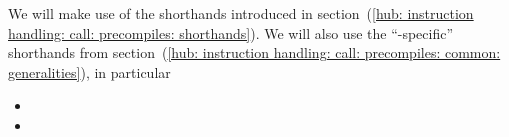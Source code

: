 We will make use of the shorthands introduced in
section~(\ref{hub: instruction handling: call: precompiles: shorthands}).
We will also use the ``-specific'' shorthands from
section~(\ref{hub: instruction handling: call: precompiles: common: generalities}),
in particular
\begin{itemize}
	\item \locAddressRecoveryFailure{}
	\item \locAddressRecoverySuccess{}
\end{itemize}
